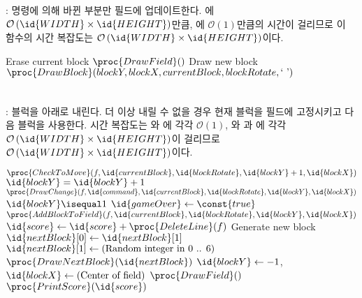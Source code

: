 \subsubsection{}: 명령에 의해 바뀐 부분만 필드에 업데이트한다.
에 $\mathcal{O}\left(\id{WIDTH}\times\id{HEIGHT}\right)$만큼, 에 $\mathcal{O}\left(1\right)$만큼의
시간이 걸리므로 이 함수의 시간 복잡도는 $\mathcal{O}\left(\id{WIDTH}\times\id{HEIGHT}\right)$이다.

\begin{codebox}
\li \Comment Erase current block
\li $\proc{DrawField}()$
\li \Comment Draw new block
\li $\proc{DrawBlock}(blockY, blockX, currentBlock, blockRotate, \mbox{` '})$
\end{codebox}

\inputminted[xleftmargin=\parindent,linenos,firstline=263,lastline=267]{c}{inc-sources/tetris-week09-experiment.c}

\newpage

\subsubsection{}: 블럭을 아래로 내린다. 더 이상 내릴 수 없을 경우 현재 블럭을 필드에 고정시키고 다음 블럭을 사용한다. 시간 복잡도는
와 에 각각 $\mathcal{O}\left(1\right)$,
와 과 에 각각 $\mathcal{O}\left(\id{WIDTH}\times\id{HEIGHT}\right)$이
걸리므로 $\mathcal{O}\left(\id{WIDTH}\times\id{HEIGHT}\right)$이다.

\begin{codebox}
\li \If $\proc{CheckToMove}(f, \id{currentBlock}, \id{blockRotate}, \id{blockY} + 1, \id{blockX})$
\li \Then
        $\id{blockY} = \id{blockY} + 1$
\li     $\proc{DrawChange}(f, \id{command}, \id{currentBlock}, \id{blockRotate}, \id{blockY}, \id{blockX})$
\li \Else
\li     \If $\id{blockY} \isequal 1$
\li     \Then
            $\id{gameOver} \gets \const{true}$
\li     \Else
\li         $\proc{AddBlockToField}(f, \id{currentBlock}, \id{blockRotate}, \id{blockY}, \id{blockX})$
\li         $\id{score} \gets \id{score} + \proc{DeleteLine}(f)$
\li         \Comment Generate new block
\li         $\id{nextBlock}[0] \gets \id{nextBlock}[1]$
\li         $\id{nextBlock}[1] \gets (\mbox{Random integer in 0 .. 6})$
\li         $\proc{DrawNextBlock}(\id{nextBlock})$
\li         $\id{blockY} \gets -1$, $\id{blockX} \gets (\mbox{Center of field})$
\li         $\proc{DrawField}()$
\li         $\proc{PrintScore}(\id{score})$
        \End
    \End
\end{codebox}

